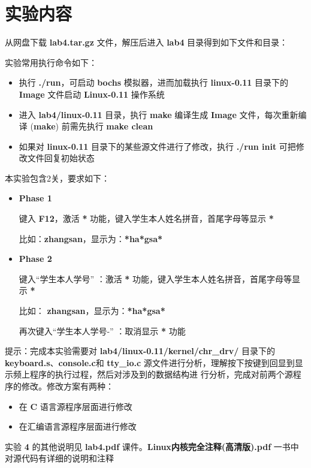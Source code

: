 \section{实验内容}
    \par 从网盘下载 \textbf{lab4.tar.gz} 文件，解压后进入 \textbf{lab4} 目录得到如下文件和目录：
    \par 实验常用执行命令如下：
    \begin{itemize}
        \item 执行 \textbf{./run}，可启动 \textbf{bochs} 模拟器，进而加载执行 \textbf{linux-0.11} 目录下的 \textbf{Image} 文件启动 \textbf{Linux-0.11} 操作系统
        \item 进入 \textbf{lab4/linux-0.11} 目录，执行 \textbf{make} 编译生成 \textbf{Image} 文件，每次重新编译 (\textbf{make}) 前需先执行 \textbf{make clean}
        \item 如果对 \textbf{linux-0.11} 目录下的某些源文件进行了修改，执行 \textbf{./run init} 可把修改文件回复初始状态
    \end{itemize}
    \par 本实验包含2关，要求如下：
    \begin{itemize}
        \item \textbf{Phase 1}
            \par 键入 \textbf{F12}，激活 \textbf{*} 功能，键入学生本人姓名拼音，首尾字母等显示 \textbf{*}
            \par 比如：\textbf{zhangsan}，显示为：\textbf{*ha*gsa*}
        \item \textbf{Phase 2}
            \par 键入“学生本人学号” ：激活 \textbf{*} 功能，键入学生本人姓名拼音，首尾字母等显示 \textbf{*}
            \par 比如： \textbf{zhangsan}，显示为：\textbf{*ha*gsa*}
            \par 再次键入“学生本人学号-” ：取消显示 \textbf{*} 功能
    \end{itemize}
    \par 提示：完成本实验需要对 \textbf{lab4/linux-0.11/kernel/chr\_drv/} 目录下的 \textbf{keyboard.s}、\textbf{console.c}和 \textbf{tty\_io.c} 源文件进行分析，理解按下按键到回显到显示频上程序的执行过程，然后对涉及到的数据结构进
    行分析，完成对前两个源程序的修改。修改方案有两种：
    \begin{itemize}
        \item 在 \textbf{C} 语言源程序层面进行修改
        \item 在汇编语言源程序层面进行修改
    \end{itemize}
    \par 实验 \textbf{4} 的其他说明见 \textbf{lab4.pdf} 课件。\textbf{Linux内核完全注释(高清版).pdf} 一书中对源代码有详细的说明和注释
    